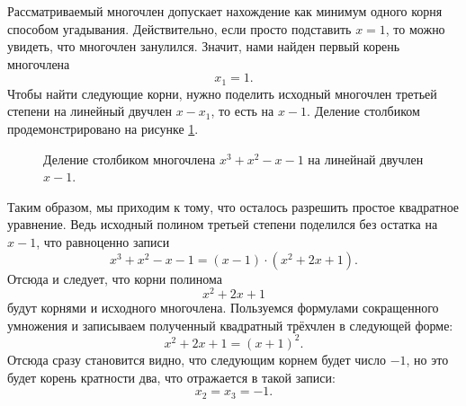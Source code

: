 \documentclass[12pt]{article}
\begin{document}
\par Рассматриваемый многочлен допускает нахождение как минимум одного корня способом угадывания. Действительно, если просто подставить $x=1$, то можно увидеть, что многочлен занулился. Значит, нами найден первый корень многочлена
\begin{equation}
 	x_1 = 1.
\end{equation} 
Чтобы найти следующие корни, нужно поделить исходный многочлен третьей степени на линейный двучлен $x-x_1$, то есть на $x-1$. Деление столбиком продемонстрировано на рисунке \ref{fig:72}.
\begin{figure}[htbp]
	\centering
	\caption{Деление столбиком многочлена $x^3+x^2-x-1$ на линейнай двучлен $x-1$.}
	\label{fig:72}
\end{figure}
Таким образом, мы приходим к тому, что осталось разрешить простое квадратное уравнение. Ведь исходный полином третьей степени поделился без остатка на $x-1$, что равноценно записи
\begin{equation}
	x^3+x^2-x-1 = (x-1)\cdot(x^2+2x+1).
\end{equation}
Отсюда и следует, что корни полинома
\begin{equation}
	x^2 + 2x +1
\end{equation}
будут корнями и исходного многочлена. Пользуемся формулами сокращенного умножения и записываем полученный квадратный трёхчлен в следующей форме:
\begin{equation}
	x^2 + 2x +1 = (x+1)^2.
\end{equation}
Отсюда сразу становится видно, что следующим корнем будет число $-1$, но это будет корень кратности два, что отражается в такой записи:
\begin{equation}
	x_2 = x_3 = -1.
\end{equation}
\end{document}
